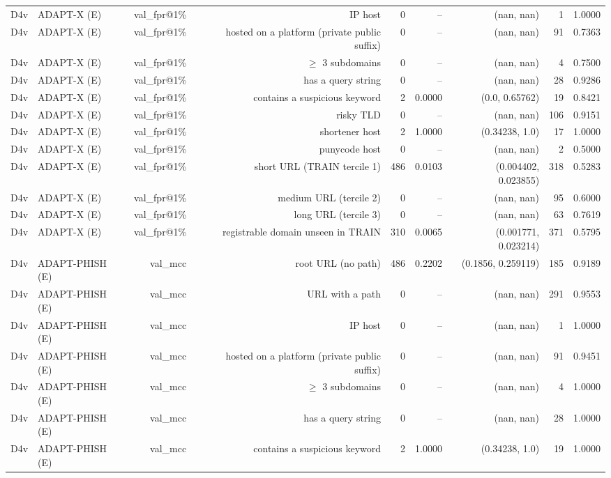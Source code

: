 \begin{table}[t]
\begin{tabular}{llrrrrrrr}
D4v & ADAPT-X (E) & val\_fpr@1\% & IP host & 0 & -- & (nan, nan) & 1 & 1.0000 \\
D4v & ADAPT-X (E) & val\_fpr@1\% & hosted on a platform (private public suffix) & 0 & -- & (nan, nan) & 91 & 0.7363 \\
D4v & ADAPT-X (E) & val\_fpr@1\% & $\geq$ 3 subdomains & 0 & -- & (nan, nan) & 4 & 0.7500 \\
D4v & ADAPT-X (E) & val\_fpr@1\% & has a query string & 0 & -- & (nan, nan) & 28 & 0.9286 \\
D4v & ADAPT-X (E) & val\_fpr@1\% & contains a suspicious keyword & 2 & 0.0000 & (0.0, 0.65762) & 19 & 0.8421 \\
D4v & ADAPT-X (E) & val\_fpr@1\% & risky TLD & 0 & -- & (nan, nan) & 106 & 0.9151 \\
D4v & ADAPT-X (E) & val\_fpr@1\% & shortener host & 2 & 1.0000 & (0.34238, 1.0) & 17 & 1.0000 \\
D4v & ADAPT-X (E) & val\_fpr@1\% & punycode host & 0 & -- & (nan, nan) & 2 & 0.5000 \\
D4v & ADAPT-X (E) & val\_fpr@1\% & short URL (TRAIN tercile 1) & 486 & 0.0103 & (0.004402, 0.023855) & 318 & 0.5283 \\
D4v & ADAPT-X (E) & val\_fpr@1\% & medium URL (tercile 2) & 0 & -- & (nan, nan) & 95 & 0.6000 \\
D4v & ADAPT-X (E) & val\_fpr@1\% & long URL (tercile 3) & 0 & -- & (nan, nan) & 63 & 0.7619 \\
D4v & ADAPT-X (E) & val\_fpr@1\% & registrable domain unseen in TRAIN & 310 & 0.0065 & (0.001771, 0.023214) & 371 & 0.5795 \\
D4v & ADAPT-PHISH (E) & val\_mcc & root URL (no path) & 486 & 0.2202 & (0.1856, 0.259119) & 185 & 0.9189 \\
D4v & ADAPT-PHISH (E) & val\_mcc & URL with a path & 0 & -- & (nan, nan) & 291 & 0.9553 \\
D4v & ADAPT-PHISH (E) & val\_mcc & IP host & 0 & -- & (nan, nan) & 1 & 1.0000 \\
D4v & ADAPT-PHISH (E) & val\_mcc & hosted on a platform (private public suffix) & 0 & -- & (nan, nan) & 91 & 0.9451 \\
D4v & ADAPT-PHISH (E) & val\_mcc & $\geq$ 3 subdomains & 0 & -- & (nan, nan) & 4 & 1.0000 \\
D4v & ADAPT-PHISH (E) & val\_mcc & has a query string & 0 & -- & (nan, nan) & 28 & 1.0000 \\
D4v & ADAPT-PHISH (E) & val\_mcc & contains a suspicious keyword & 2 & 1.0000 & (0.34238, 1.0) & 19 & 1.0000 \\

\end{tabular}
\end{table}
